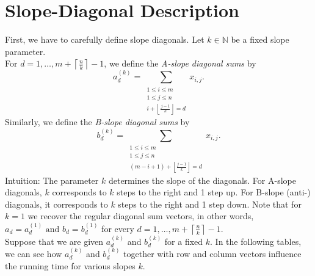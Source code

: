 \documentclass{report}
\begin{document}
\section{Slope-Diagonal Description}
First, we have to carefully define slope diagonals. Let
$k \in \mathbb{N}$ be a fixed slope parameter. \\
For $d = 1, \dots, m + \left\lceil \frac{n}{k} \right\rceil - 1$, we define the
\emph{A-slope diagonal sums} by
\[
a^{(k)}_d
=
\sum_{\substack{1 \le i \le m \\ 1 \le j \le n \\
i + \left\lfloor \frac{j-1}{k} \right\rfloor = d}}
x_{i,j}.
\]
Similarly, we define the \emph{B-slope diagonal sums} by
\[
b^{(k)}_d
=
\sum_{\substack{1 \le i \le m \\ 1 \le j \le n \\
(m - i + 1) + \left\lfloor \frac{j-1}{k} \right\rfloor = d}}
x_{i,j}.
\] 
Intuition: The parameter $k$ determines the slope of the diagonals. 
For A-slope diagonals, $k$ corresponds to $k$ steps to the right and 1 step up. 
For B-slope (anti-) diagonals, it corresponds to $k$ steps to the right and 1 step down. 
Note that for $k=1$ we recover the regular diagonal sum vectors, in other words, \(a_d = a_d^{(1)} \text{ and } b_d = b_d^{(1)}\) for every $d = 1, \dots, m + \left\lceil \frac{n}{k} \right\rceil - 1$. \\

Suppose that we are given \(a^{(k)}_d\) and \(b^{(k)}_d\) for a fixed \(k\). In the following tables, we can see how \(a^{(k)}_d\) and \(b^{(k)}_d\) together with row and column vectors influence the running time for various slopes \(k\).
\end{document}
